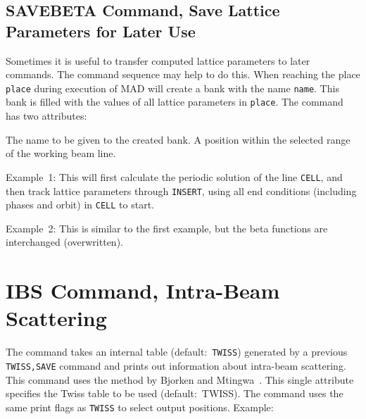 \subsection{SAVEBETA Command, Save Lattice Parameters for Later Use}
\label{S-SVBT}
Sometimes it is useful to transfer computed lattice parameters to
later commands.
The command sequence
may help to do this.
When reaching the place {\tt place} during execution of 
MAD will create a  bank with the name {\tt name}.
This bank is filled with the values of all lattice parameters
in {\tt place}.
The  command has two attributes:
\begin{mylist}
The name to be given to the created  bank.
A position within the selected range of the working beam line.
\end{mylist}
Example~1:
This will first calculate the periodic solution of the line {\tt CELL},
and then track lattice parameters through {\tt INSERT}, using all end
conditions (including phases and orbit) in {\tt CELL} to start.
 
Example~2:
This is similar to the first example,
but the beta functions are interchanged (overwritten).
 
\section{IBS Command, Intra-Beam Scattering}
\label{S-IBS}
The  command takes an internal table (default:~{\tt TWISS})
generated by a previous {\tt TWISS,SAVE} command
and prints out information about intra-beam scattering.
This command uses the method by Bjorken and Mtingwa~\cite{B-BM,B-CM}.
This single attribute  specifies the Twiss table to be
used (default:~TWISS).
The  command uses the same print flags as {\tt TWISS}
to select output positions.
Example:
 
